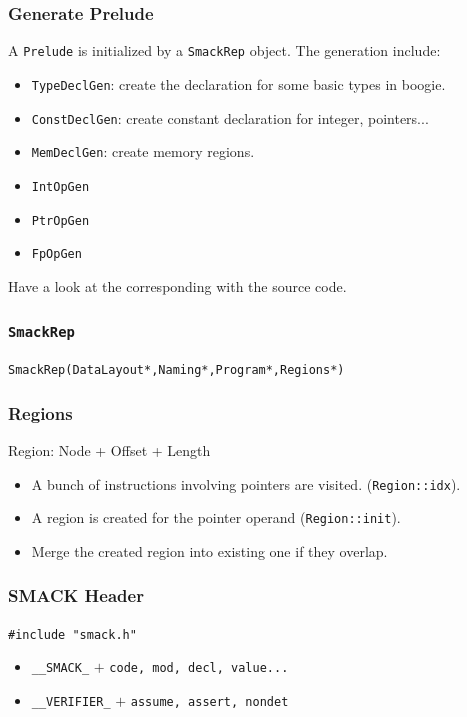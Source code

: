\documentclass[11pt]{beamer}
\begin{document}
\begin{frame}\frametitle{Generate Prelude}
A \texttt{Prelude} is initialized by a \texttt{SmackRep} object. The generation include:
\begin{itemize}
\item \texttt{TypeDeclGen}: create the declaration for some basic types in boogie. 
\item \texttt{ConstDeclGen}: create constant declaration for integer, pointers...
\item \texttt{MemDeclGen}: create memory regions.
\item \texttt{IntOpGen}
\item \texttt{PtrOpGen}
\item \texttt{FpOpGen}
\end{itemize}

Have a look at the corresponding with the source code.

\end{frame}

\begin{frame}\frametitle{\texttt{SmackRep}}
\begin{center}
\texttt{SmackRep(DataLayout*,Naming*,Program*,Regions*)}
\end{center}
\end{frame}

\begin{frame}\frametitle{Regions}
\begin{center}

Region: Node + Offset + Length
\end{center}

\begin{itemize}
\item A bunch of instructions involving pointers are visited. (\texttt{Region::idx}).

\item A region is created for the pointer operand (\texttt{Region::init}).

\item Merge the created region into existing one if they overlap. 
\end{itemize}
\end{frame}


\begin{frame}\frametitle{SMACK Header}
\begin{center}
\texttt{\#include "smack.h"}
\end{center}

\begin{itemize}
\item \texttt{\_\_SMACK\_} $+ $ \texttt{code, mod, decl, value...}
\item \texttt{\_\_VERIFIER\_} $+$ \texttt{assume, assert, nondet} 
\end{itemize}


\end{frame}
\end{document}
